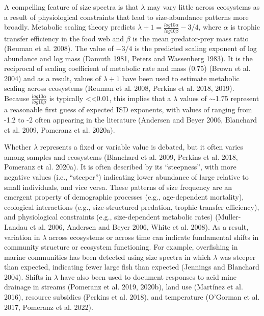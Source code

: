 \documentclass[
  12pt,
]{article}
\begin{document}
A compelling feature of size spectra is that \(\lambda\) may vary little
across ecosystems as a result of physiological constraints that lead to
size-abundance patterns more broadly. Metabolic scaling theory predicts
\(\lambda + 1 = \frac{log10\alpha}{log10\beta} - 3/4\), where \(\alpha\)
is trophic transfer efficiency in the food web and \(\beta\) is the mean
predator-prey mass ratio (Reuman et al. 2008). The value of \(-3/4\) is
the predicted scaling exponent of log abundance and log mass (Damuth
1981, Peters and Wassenberg 1983). It is the reciprocal of scaling
coefficient of metabolic rate and mass (0.75) (Brown et al. 2004) and as
a result, values of \(\lambda + 1\) have been used to estimate metabolic
scaling across ecosystems (Reuman et al. 2008, Perkins et al. 2018,
2019). Because \(\frac{log10\alpha}{log10\beta}\) is typically
\textless\textless0.01, this implies that a \(\lambda\) values of
\textasciitilde-1.75 represent a reasonable first guess of expected ISD
exponents, with values of ranging from -1.2 to -2 often appearing in the
literature (Andersen and Beyer 2006, Blanchard et al. 2009, Pomeranz et
al. 2020a).

Whether \(\lambda\) represents a fixed or variable value is debated, but
it often varies among samples and ecosystems (Blanchard et al. 2009,
Perkins et al. 2018, Pomeranz et al. 2020a). It is often described by
its ``steepness'', with more negative values (i.e., ``steeper'')
indicating lower abundance of large relative to small individuals, and
vice versa. These patterns of size frequency are an emergent property of
demographic processes (e.g., age-dependent mortality), ecological
interactions (e.g., size-structured predation, trophic transfer
efficiency), and physiological constraints (e.g., size-dependent
metabolic rates) (Muller-Landau et al. 2006, Andersen and Beyer 2006,
White et al. 2008). As a result, variation in \(\lambda\) across
ecosystems or across time can indicate fundamental shifts in community
structure or ecosystem functioning. For example, overfishing in marine
communities has been detected using size spectra in which \(\lambda\)
was steeper than expected, indicating fewer large fish than expected
(Jennings and Blanchard 2004). Shifts in \(\lambda\) have also been used
to document responses to acid mine drainage in streams (Pomeranz et al.
2019, 2020b), land use (Martínez et al. 2016), resource subsidies
(Perkins et al. 2018), and temperature (O'Gorman et al. 2017, Pomeranz
et al. 2022).
\end{document}
